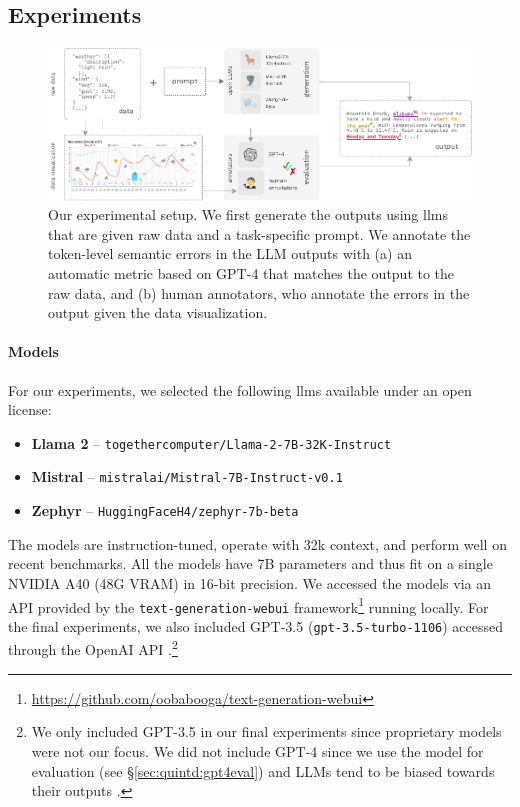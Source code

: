 \subsection{Experiments}
\label{sec:quintd:experiments}

\begin{figure}[t]
    \centering
    \includegraphics[width=\textwidth]{img/quintd_process.pdf}
    \caption{Our experimental setup. We first generate the outputs using \acp{llm} that are given raw data and a task-specific prompt. We annotate the token-level semantic errors in the LLM outputs with (a) an automatic metric based on GPT-4 that matches the output to the raw data, and (b) human annotators, who annotate the errors in the output given the data visualization.}\label{fig:quintd:process}
\end{figure}

\paragraph{Models}
\label{sec:quintd:models}
For our experiments, we selected the following \acp{llm} available under an open license:

\begin{itemize}
    \item \textbf{Llama 2} \cite{touvronLlamaOpenFoundation2023,llama-2-7b-32k} -- \texttt{\small together\-computer\-/Llama-2-7B\--32K-Instruct}
    \item \textbf{Mistral} \cite{jiangMistral7B2023} -- \texttt{\small mistralai/Mistral-7B-Instruct-v0.1}
    \item \textbf{Zephyr}  \cite{tunstallZephyrDirectDistillation2023} -- \texttt{\small HuggingFaceH4/zephyr-7b-beta}
\end{itemize}

The models are instruction-tuned, operate with 32k context, and perform well on recent benchmarks. All the models have 7B parameters and thus fit on a single NVIDIA A40 (48G VRAM) in 16-bit precision. We accessed the models via an API provided by the \texttt{text-generation-webui} framework\footnote{\url{https://github.com/oobabooga/text-generation-webui}} running locally.
For the final experiments, we also included GPT-3.5 (\texttt{gpt-3.5-turbo-1106}) accessed through the OpenAI API \cite{chatgpt}.\footnote{We only included GPT-3.5 in our final experiments since proprietary models were not our focus. We did not include GPT-4 since we use the model for evaluation (see §\ref{sec:quintd:gpt4eval}) and LLMs tend to be biased towards their outputs \cite{kooBenchmarkingCognitiveBiases2023,stureborgLargeLanguageModels2024}.}

